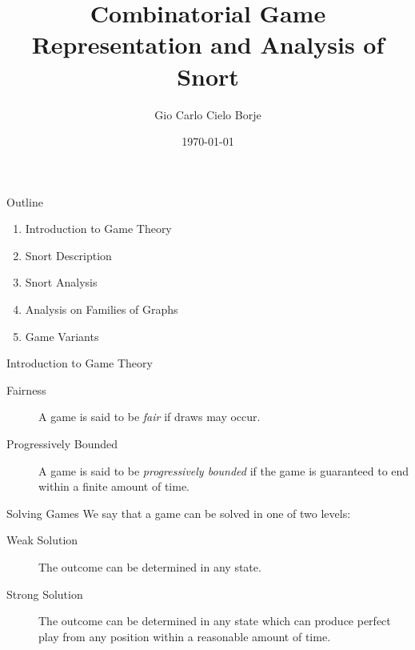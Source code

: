 \documentclass[mathserif]{beamer}
\author{Gio Carlo Cielo Borje}
\institute{UC Irvine}
\title{Combinatorial Game Representation and Analysis of Snort}
\date{\today}
\begin{document}
\begin{frame}
	\maketitle
\end{frame}

\begin{frame}{Outline}
	\begin{enumerate}
		\item Introduction to Game Theory
		\item Snort Description
		\item Snort Analysis
		\item Analysis on Families of Graphs
		\item Game Variants
	\end{enumerate}
\end{frame}

\begin{frame}{Introduction to Game Theory}
	\begin{description}
		\item [Fairness] A game is said to be \emph{fair} if draws may
			occur.
		\item [Progressively Bounded] A game is said to be
			\emph{progressively bounded} if the game is guaranteed to end
			within a finite amount of time.
	\end{description}
\end{frame}

\begin{frame}{Solving Games}
	We say that a game can be solved in one of two levels:

	\begin{description}
		\item [Weak Solution] The outcome can be determined in any
		state.
		\item [Strong Solution] The outcome can be determined in
			any state which can produce perfect play from any position
			within a reasonable amount of time.
	\end{description}
\end{frame}
\end{document}

